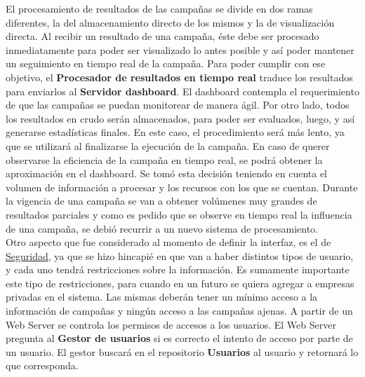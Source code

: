 \documentclass[a4paper, 11pt]{article}
\begin{document}
El procesamiento de resultados de las campañas se divide en dos ramas diferentes, la del almacenamiento directo de los mismos y la de visualización directa. 
Al recibir un resultado de una campaña, éste debe ser procesado inmediatamente para poder ser visualizado lo antes posible y así poder mantener un seguimiento en tiempo real de la campaña. Para poder cumplir con ese objetivo, el \textbf{Procesador de resultados en tiempo real} traduce los resultados para enviarlos al \textbf{Servidor dashboard}. El dashboard contempla el requerimiento de que las campañas se puedan monitorear de manera ágil. %
Por otro lado, todos los resultados en crudo serán almacenados, para poder ser evaluados, luego, y así generarse estadísticas finales. 
En este caso, el procedimiento será más lento, ya que se utilizará al finalizarse la ejecución de la campaña. En caso de querer observarse la eficiencia de la campaña en tiempo real, se podrá obtener la aproximación en el dashboard. 
Se tomó esta decisión teniendo en cuenta el volumen de información a procesar y los recursos con los que se cuentan. Durante la vigencia de una campaña se van a obtener volúmenes muy grandes de resultados parciales y como es pedido que se observe en tiempo real la influencia de una campaña, se debió recurrir a un nuevo sistema de procesamiento.\\

Otro aspecto que fue considerado al momento de definir la interfaz, es el de \underline{Seguridad}, ya que se hizo hincapié en que van a haber distintos tipos de usuario, y cada uno tendrá restricciones sobre la información. Es sumamente importante este tipo de restricciones, para cuando en un futuro se quiera agregar a empresas privadas en el sistema. Las mismas deberán tener un mínimo acceso a la información de campañas y ningún acceso a las campañas ajenas. A partir de un Web Server se controla los permisos de accesos a los usuarios. El Web Server pregunta al \textbf{Gestor de usuarios} si es correcto el intento de acceso por parte de un usuario. El gestor buscará en el repositorio \textbf{Usuarios} al usuario y retornará lo que corresponda. \\
\end{document}
